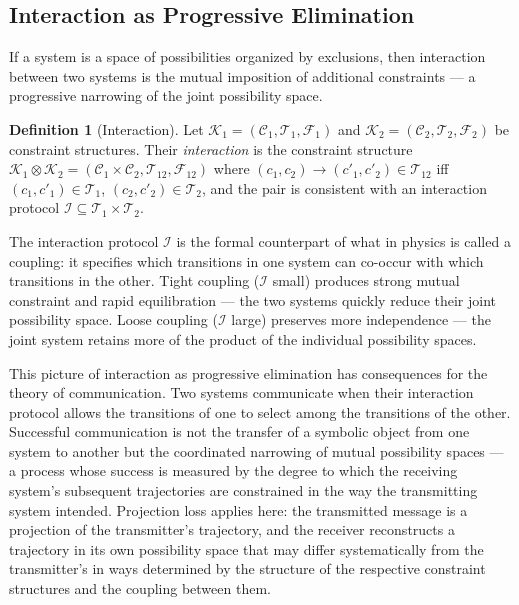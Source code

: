 \documentclass[12pt, twoside]{article}
\theoremstyle{plain}
\theoremstyle{definition}
\newtheorem{definition}[theorem]{Definition}
\theoremstyle{remark}
\newcommand{\Cfg}{\mathcal{C}}
\newcommand{\Trans}{\mathcal{T}}
\begin{document}
\subsection{Interaction as Progressive Elimination}

If a system is a space of possibilities organized by exclusions,
then interaction between two systems is the mutual imposition of
additional constraints — a progressive narrowing of the joint
possibility space.

\begin{definition}[Interaction]
Let $\mathcal{K}_1 = (\Cfg_1, \Trans_1, \mathcal{F}_1)$ and
$\mathcal{K}_2 = (\Cfg_2, \Trans_2, \mathcal{F}_2)$ be constraint structures.
Their \emph{interaction} is the constraint structure
$\mathcal{K}_1 \otimes \mathcal{K}_2 = (\Cfg_1 \times \Cfg_2, \Trans_{12}, \mathcal{F}_{12})$
where $(c_1, c_2) \to (c'_1, c'_2) \in \Trans_{12}$ iff
$(c_1, c'_1) \in \Trans_1$, $(c_2, c'_2) \in \Trans_2$,
and the pair is consistent with an interaction protocol
$\mathcal{I} \subseteq \Trans_1 \times \Trans_2$.
\end{definition}

The interaction protocol $\mathcal{I}$ is the formal counterpart of
what in physics is called a coupling: it specifies which transitions
in one system can co-occur with which transitions in the other.
Tight coupling ($\mathcal{I}$ small) produces strong mutual constraint
and rapid equilibration — the two systems quickly reduce their
joint possibility space.
Loose coupling ($\mathcal{I}$ large) preserves more independence —
the joint system retains more of the product of the individual
possibility spaces.

This picture of interaction as progressive elimination has consequences
for the theory of communication.
Two systems communicate when their interaction protocol allows the
transitions of one to select among the transitions of the other.
Successful communication is not the transfer of a symbolic object
from one system to another but the coordinated narrowing of
mutual possibility spaces — a process whose success is measured by
the degree to which the receiving system's subsequent trajectories
are constrained in the way the transmitting system intended.
Projection loss applies here: the transmitted message is a projection
of the transmitter's trajectory, and the receiver reconstructs a
trajectory in its own possibility space that may differ systematically
from the transmitter's in ways determined by the structure
of the respective constraint structures and the coupling between them.
\end{document}

